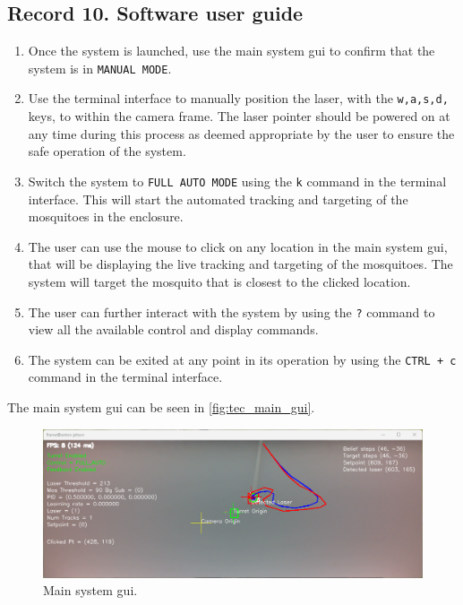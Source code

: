 \subsection{Record 10. Software user guide}\label{subsec:software_user_guide}
\begin{enumerate}
  \item Once the system is launched, use the main system \gls{gui} to confirm that the system is in \texttt{MANUAL MODE}.
  \item Use the terminal interface to manually position the laser, with the \texttt{w,a,s,d,} keys, to within the camera frame. The laser pointer should be powered on at any time during this process as deemed appropriate by the user to ensure the safe operation of the system.
  \item Switch the system to \texttt{FULL AUTO MODE} using the \texttt{k} command in the terminal interface. This will start the automated tracking and targeting of the mosquitoes in the enclosure.
  \item The user can use the mouse to click on any location in the main system \gls{gui}, that will be displaying the live tracking and targeting of the mosquitoes. The system will target the mosquito that is closest to the clicked location.
  \item The user can further interact with the system by using the \texttt{?} command to view all the available control and display commands.
  \item The system can be exited at any point in its operation by using the \texttt{CTRL\,+\,c} command in the terminal interface.
\end{enumerate}

The main system \gls{gui} can be seen in \autoref{fig:tec_main_gui}.
\begin{figure}
  \centering
  \includegraphics[width=\textwidth]{figures/main_gui.png}
  \caption{Main system \gls{gui}.}
  \label{fig:tec_main_gui}
\end{figure}




